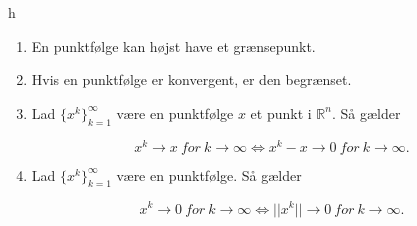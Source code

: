 \begin{mytheo}{}
h
\begin{enumerate}[label=(\alph*)]
    \item En punktfølge kan højst have et grænsepunkt. 
    \item Hvis en punktfølge er konvergent, er den begrænset. 
    \item Lad $\{x^k\}^\infty_{k=1}$ være en punktfølge $x$ et punkt i $\mathbb{R}^n$. Så gælder
    
    \begin{equation}
        x^k \to x \ for \ k \to \infty \Leftrightarrow x^k-x \to 0 \ for \ k \to \infty.
    \end{equation}
    
    \item Lad $\{x^k\}^\infty_{k=1}$ være en punktfølge. Så gælder
    
    \begin{equation}
        x^k \to 0 \ for \ k \to \infty \Leftrightarrow ||x^k|| \to 0 \ for \ k \to \infty.
    \end{equation}
    
\end{enumerate}

\end{mytheo}


